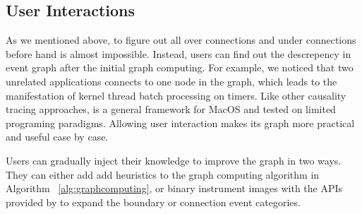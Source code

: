 \subsection{User Interactions}\label{subsec:userinteraction}


As we mentioned above, to figure out all over connections and under connections
before hand is almost impossible. Instead, users can find out the descrepency
in event graph after the initial graph computing. For example, we noticed that
two unrelated applications connects to one node in the graph, which leads to the
manifestation of kernel thread batch processing on timers. Like other causality
tracing approaches, \xxx is a general framework for MacOS and tested on limited
programing paradigms. Allowing user interaction makes its graph more practical
and useful case by case.

Users can gradually inject their knowledge to improve the graph in two ways.
They can either add add heuristics to the graph computing algorithm in Algorithm
~\ref{alg:graphcomputing}, or binary instrument images with the APIs provided by
\xxx to expand the boundary or connection event categories.
